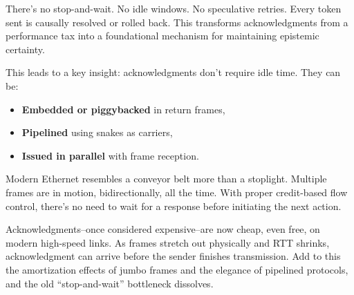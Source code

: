 \documentclass[../../../OAE-SPEC-MAIN.tex]{subfiles}
\begin{document}
There’s no stop-and-wait. No idle windows. No speculative retries. Every token sent is causally resolved or rolled back. This transforms acknowledgments from a performance tax into a foundational mechanism for maintaining epistemic certainty.

This leads to a key insight: acknowledgments don’t require idle time. They can be:

\begin{itemize}
  \item \textbf{Embedded or piggybacked} in return frames,
  \item \textbf{Pipelined} using snakes as carriers,
  \item \textbf{Issued in parallel} with frame reception.
\end{itemize}

Modern Ethernet resembles a conveyor belt more than a stoplight. Multiple frames are in motion, bidirectionally, all the time. With proper credit-based flow control, there’s no need to wait for a response before initiating the next action.

Acknowledgments--once considered expensive--are now cheap, even free, on modern high-speed links. As frames stretch out physically and RTT shrinks, acknowledgment can arrive before the sender finishes transmission. Add to this the amortization effects of jumbo frames and the elegance of pipelined protocols, and the old “stop-and-wait” bottleneck dissolves.
\end{document}
